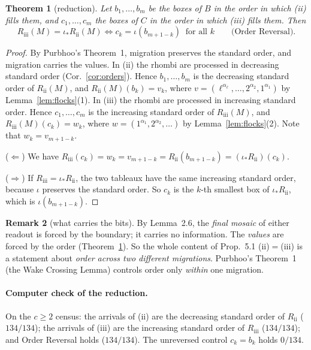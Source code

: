 \documentclass[11pt]{article}
\newtheorem{theorem}{Theorem}
\theoremstyle{definition}
\newtheorem{remark}[theorem]{Remark}
\newcommand{\Rii}{R_{\mathrm{ii}}}
\newcommand{\Riii}{R_{\mathrm{iii}}}
\begin{document}
\begin{theorem}[reduction]\label{thm:reduction}
Let $b_1,\dots,b_m$ be the boxes of $B$ in the order in which (ii) fills them, and $c_1,\dots,c_m$ the boxes of $C$ in the order in
which (iii) fills them. Then
\[\Riii(M)=\iota_*\Rii(M)\iff c_k=\iota(b_{m+1-k})\ \text{ for all }k\qquad\text{(Order Reversal).}\]
\end{theorem}
\begin{proof}
By Purbhoo's Theorem~1, migration preserves the standard order, and migration carries the values. In (ii) the rhombi are processed
in decreasing standard order (Cor.~\ref{cor:orders}). Hence $b_1,\dots,b_m$ is the decreasing standard order of $\Rii(M)$, and
$\Rii(M)(b_k)=v_k$, where $v=(\ell^{\alpha_\ell},\dots,2^{\alpha_2},1^{\alpha_1})$ by Lemma~\ref{lem:flocks}(1). In (iii) the
rhombi are processed in increasing standard order. Hence $c_1,\dots,c_m$ is the increasing standard order of $\Riii(M)$, and
$\Riii(M)(c_k)=w_k$, where $w=(1^{\alpha_1},2^{\alpha_2},\dots)$ by Lemma~\ref{lem:flocks}(2). Note that $w_k=v_{m+1-k}$.

($\Leftarrow$) We have $\Riii(c_k)=w_k=v_{m+1-k}=\Rii(b_{m+1-k})=(\iota_*\Rii)(c_k)$.

($\Rightarrow$) If $\Riii=\iota_*\Rii$, the two tableaux have the same increasing standard order, because $\iota$ preserves the
standard order. So $c_k$ is the $k$-th smallest box of $\iota_*\Rii$, which is $\iota(b_{m+1-k})$.
\end{proof}

\begin{remark}[what carries the bits]
By Lemma~2.6, the \emph{final mosaic} of either readout is forced by the boundary; it carries no information. The \emph{values}
are forced by the order (Theorem~\ref{thm:reduction}). So the whole content of Prop.~5.1 (ii)$=$(iii) is a statement about
\emph{order across two different migrations}. Purbhoo's Theorem~1 (the Wake Crossing Lemma) controls order only \emph{within}
one migration.
\end{remark}

\paragraph{Computer check of the reduction.} On the $c\ge2$ census: the arrivals of (ii) are the decreasing standard order of
$\Rii$ ($134/134$); the arrivals of (iii) are the increasing standard order of $\Riii$ ($134/134$); and Order Reversal holds
($134/134$). The unreversed control $c_k=b_k$ holds $0/134$.
\end{document}
